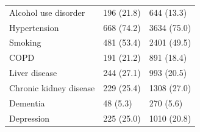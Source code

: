 \begin{table}
\begin{tabular}[t]{lll}
Alcohol use disorder & 196 (21.8) & 644 (13.3)\\
Hypertension & 668 (74.2) & 3634 (75.0)\\
Smoking & 481 (53.4) & 2401 (49.5)\\
\addlinespace
COPD & 191 (21.2) & 891 (18.4)\\
Liver disease & 244 (27.1) & 993 (20.5)\\
Chronic kidney disease & 229 (25.4) & 1308 (27.0)\\
Dementia & 48 (5.3) & 270 (5.6)\\
Depression & 225 (25.0) & 1010 (20.8)\\
\bottomrule
\end{tabular}
\end{table}
